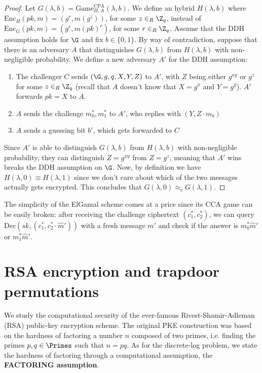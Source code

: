 \documentclass[a4paper, 12pt]{report}
\begin{document}
    \begin{proof}
        Let $G(\lambda,b) = \mathrm{Game}_{\Pi,A}^{\text{CPA}}(\lambda, b)$. We define an hybrid $H(\lambda, b)$ where $\mathrm{Enc}_H(pk, m) = (g^r, m (g^z))$, for some $z \in_R \Z_q$, instead of $\mathrm{Enc}_G(pk, m) = (g^r, m(pk)^r)$, for some $r \in_R \Z_q$. Assume that the DDH assumption holds for $\G$ and fix $b \in \{0,1\}$. By way of contradiction, suppose that there is an adversary $A$ that distinguishes $G(\lambda,b)$ from $H(\lambda,b)$ with non-negligible probability. We define a new adversary $A'$ for the DDH assumption:
        \begin{enumerate}
            \item The challenger $C$ sends $(\G,g,q, X, Y, Z)$ to $A'$, with $Z$ being either $g^{xy}$ or $g^z$ for some $z \in_R \Z_q$ (recall that $A$ doesn't know that $X = g^x$ and $Y = g^y$). $A'$ forwards $pk = X$ to $A$.
            \item $A$ sends the challenge $m_0^*, m_1^*$ to $A'$, who replies with $(Y, Z \cdot m_b)$
            \item $A$ sends a guessing bit $b'$, which gets forwarded to $C$
        \end{enumerate}

        Since $A'$ is able to distinguish $G(\lambda,b)$ from $H(\lambda,b)$ with non-negligible probability, they can distinguish $Z = g^{xy}$ from $Z = g^z$, meaning that $A'$ wins breaks the DDH assumption on $\G$. Now, by definition we have $H(\lambda, 0) \equiv H(\lambda, 1)$ since we don't care about which of the two messages actually gets encrypted. This concludes that $G(\lambda,0) \approx_c G(\lambda, 1)$.
    \end{proof}

    The simplicity of the ElGamal scheme comes at a price since its CCA game can be easily broken: after receiving the challenge ciphertext $(c_1^*, c_2^*)$, we can query $\mathrm{Dec}(sk, (c_1^*, c_2^* \cdot \widehat m'))$ with a fresh message $m'$ and check if the answer is $m_0^*\widehat m'$ or $m_1^* \widehat m'$.

    \newpage
    
    \section{RSA encryption and trapdoor permutations}

    We study the computational security of the ever-famous Rivest-Shamir-Adleman (RSA) public-key encryption scheme. The original PKE construction was based on the hardness of factoring a number $n$ composed of two primes, i.e. finding the primes $p,q \in \Primes$ such that $n = pq$. As for the discrete-log problem, we state the hardness of factoring through a computational assumption, the \textbf{FACTORING assumption}.
\end{document}
